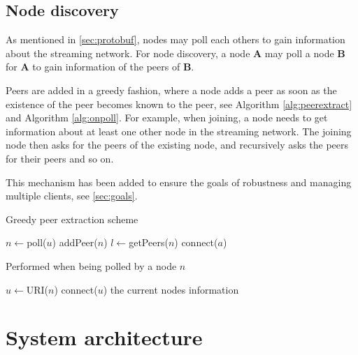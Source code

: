 \documentclass[10pt, a4paper]{article}
\begin{document}
\subsection{Node discovery}
\label{sec:node-discovery}

As mentioned in \autoref{sec:protobuf}, nodes may poll each others to
gain information about the streaming network. For node discovery, a
node \textbf{A} may poll a node \textbf{B} for \textbf{A} to gain
information of the peers of \textbf{B}.

Peers are added in a greedy fashion, where a node adds a peer as soon
as the existence of the peer becomes known to the peer, see Algorithm
\autoref{alg:peerextract} and Algorithm \autoref{alg:onpoll}. For
example, when joining, a node needs to get information about at least
one other node in the streaming network. The joining node then asks
for the peers of the existing node, and recursively asks the peers for
their peers and so on.

This mechanism has been added to ensure the goals of robustness and
managing multiple clients, see \autoref{sec:goals}.

\begin{algorithm}
  \caption{Greedy peer extraction scheme}
  \label{alg:peerextract}
  \begin{algorithmic}[1]
    \State $n \gets$poll($u$)
    \State addPeer($n$)
    \State $l \gets$getPeers($n$)
    \State connect($a$)
    \EndIf
    \EndFor
    \Else
    \State \Return
    \EndIf
    \EndProcedure
  \end{algorithmic}
\end{algorithm}

\begin{algorithm}
  \caption{Performed when being polled by a node $n$}
  \label{alg:onpoll}
  \begin{algorithmic}[1]
    \State $u\gets$URI($n$)
    \State connect($u$)
    \EndIf
    \State \Return the current nodes information
    \EndProcedure
  \end{algorithmic}
\end{algorithm}

\section{System architecture}
\label{sec:system}
\end{document}
